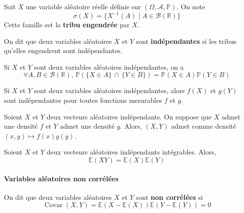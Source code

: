 	
	\begin{definition}
		Soit $X$ une variable aléatoire réelle définie sur $(\Omega, \mathcal{A}, \mathbb{P})$. On note
		\[ \sigma(X) = \{ X^{-1}(A) \mid A \in \mathcal{B}(\mathbb{R}) \} \]
		Cette famille est la \textbf{tribu engendrée} par $X$.
	\end{definition}
	
	\begin{definition}
		On dit que deux variables aléatoires $X$ et $Y$ sont \textbf{indépendantes} si les tribus qu'elles engendrent sont indépendantes.
	\end{definition}
	
	\begin{example}
		Si $X$ et $Y$ sont deux variables aléatoires indépendantes, on a
		\[ \forall A, B \in \mathcal{B}(\mathbb{R}), \, \mathbb{P}(\{ X \in A \} \, \cap \, \{ Y \in B \}) = \mathbb{P}(X \in A) \mathbb{P}(Y \in B) \]
	\end{example}
	
	\begin{proposition}
		Si $X$ et $Y$ sont deux variables aléatoires indépendantes, alors $f(X)$ et $g(Y)$ sont indépendantes pour toutes fonctions mesurables $f$ et $g$.
	\end{proposition}
	
	
	\begin{proposition}
		Soient $X$ et $Y$ deux vecteurs aléatoires indépendants. On suppose que $X$ admet une densité $f$ et $Y$ admet une densité $g$. Alors, $(X,Y)$ admet comme densité $(x,y) \mapsto f(x)g(y)$.
	\end{proposition}
	
	
	\begin{proposition}
		Soient $X$ et $Y$ deux vecteurs aléatoires indépendants intégrables. Alors,
		\[ \mathbb{E}(XY) = \mathbb{E}(X) \mathbb{E}(Y) \]
	\end{proposition}
	
	\paragraph{Variables aléatoires non corrélées}
	
	
	\begin{definition}
		On dit que deux variables aléatoires $X$ et $Y$ sont \textbf{non corrélées} si
		\[ \operatorname{Covar}(X,Y) = \mathbb{E}(X - \mathbb{E}(X))\mathbb{E}(Y - \mathbb{E}(Y)) = 0 \]
	\end{definition}
	

